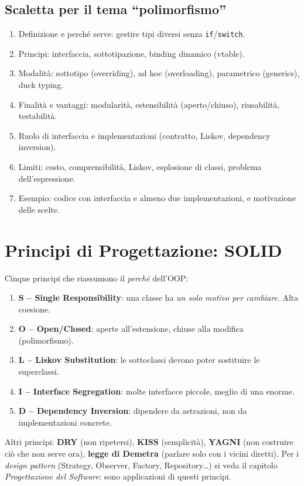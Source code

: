 \subsection{Scaletta per il tema ``polimorfismo''}
\begin{enumerate}
    \item Definizione e perché serve: gestire tipi diversi senza \texttt{if}/\texttt{switch}.
    \item Principi: interfaccia, sottotipazione, binding dinamico (vtable).
    \item Modalità: sottotipo (overriding), ad hoc (overloading), parametrico (generics), duck typing.
    \item Finalità e vantaggi: modularità, estensibilità (aperto/chiuso), riusabilità, testabilità.
    \item Ruolo di interfaccia e implementazioni (contratto, Liskov, dependency inversion).
    \item Limiti: costo, comprensibilità, Liskov, esplosione di classi, problema dell'espressione.
    \item Esempio: codice con interfaccia e almeno due implementazioni, e motivazione delle scelte.
\end{enumerate}

\section{Principi di Progettazione: SOLID}
Cinque principi che riassumono il \emph{perché} dell'OOP:
\begin{enumerate}
    \item \textbf{S -- Single Responsibility}: una classe ha \emph{un solo motivo per cambiare}. Alta coesione.
    \item \textbf{O -- Open/Closed}: aperte all'estensione, chiuse alla modifica (polimorfismo).
    \item \textbf{L -- Liskov Substitution}: le sottoclassi devono poter sostituire le superclassi.
    \item \textbf{I -- Interface Segregation}: molte interfacce piccole, meglio di una enorme.
    \item \textbf{D -- Dependency Inversion}: dipendere da astrazioni, non da implementazioni concrete.
\end{enumerate}
Altri principi: \textbf{DRY} (non ripetersi), \textbf{KISS} (semplicità), \textbf{YAGNI} (non costruire ciò che non serve ora), \textbf{legge di Demetra} (parlare solo con i vicini diretti). Per i \emph{design pattern} (Strategy, Observer, Factory, Repository\ldots) si veda il capitolo \emph{Progettazione del Software}: sono applicazioni di questi principi.

